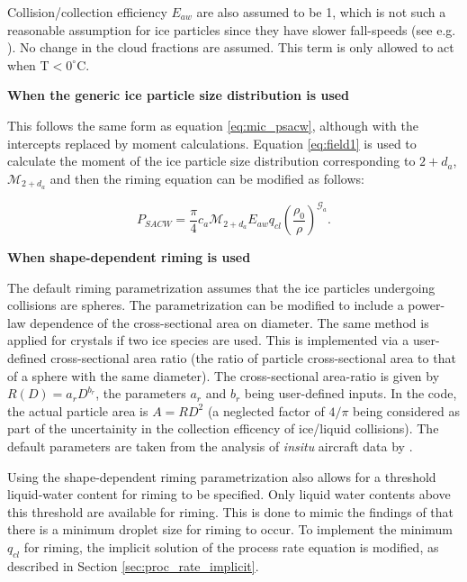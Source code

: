 \documentclass{UMDP_article}
\begin{document}
Collision/collection efficiency $E_{aw}$ are also assumed to be 1,
which is not such a reasonable assumption for ice particles since they
have slower fall-speeds (see e.g. \citealp{Mitchell:1996}). 
No change in the cloud fractions are assumed. 
This term is only allowed to act when T$ < 0 ^{\circ}$C.

\textbf{When the generic ice particle size distribution is used}

This follows the same form as equation \ref{eq:mic_psacw}, although with the 
intercepts replaced by moment calculations. Equation \ref{eq:field1} is used
to calculate the moment of the ice particle size distribution corresponding
to $2+d_a$, $\mathcal{M}_{2+d_a}$ and then the riming equation can be modified
as follows:

\begin{equation}
 P_{SACW} = \frac{\pi}{4} c_a \mathcal{M}_{2+d_a} E_{aw} q_{cl}
\left(\frac{\rho_0}{\rho}\right)^{\mathcal{G}_a}.
\label{eq:mic_psacw_psd}
\end{equation}

\textbf{When shape-dependent riming is used}

The default riming parametrization assumes that the ice particles
undergoing collisions are spheres. The parametrization can be modified to
include a power-law dependence of the cross-sectional area on diameter.
The same method is applied for crystals if two ice species are used.
This is implemented via a user-defined cross-sectional area ratio
(the ratio of particle cross-sectional area to that of a sphere
with the same diameter). The cross-sectional area-ratio is given by
$R(D) = a_r D^{b_r}$, the parameters $a_r$ and $b_r$ being user-defined inputs.
In the code, the actual particle area is $A = RD^2$ (a neglected factor
of $4/\pi$ being considered as part of the uncertainity in the
collection efficency of ice/liquid collisions).
The default parameters are taken from the analysis of {\it insitu} aircraft data by \cite{Heymsfield:Milo:2003}.

Using the shape-dependent riming parametrization also allows for
a threshold liquid-water content for riming to be specified. Only
liquid water contents above this threshold are available for riming.
This is done to mimic the findings of \cite{Harimaya:1975}
that there is a minimum droplet size for riming to occur.
To implement the minimum  $q_{cl}$ for riming, the implicit solution of the process rate equation is modified, as described in Section
\ref{sec:proc_rate_implicit}.
\end{document}
